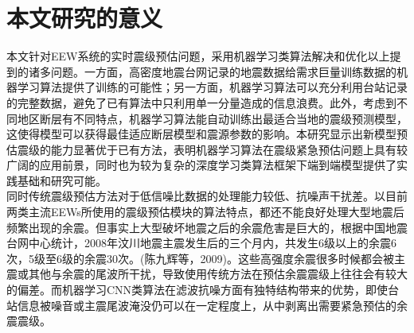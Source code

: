 \section{本文研究的意义}
\indent 本文针对EEW系统的实时震级预估问题，采用机器学习类算法解决和优化以上提到的诸多问题。一方面，高密度地震台网记录的地震数据给需求巨量训练数据的机器学习算法提供了训练的可能性；另一方面，机器学习算法可以充分利用台站记录的完整数据，避免了已有算法中只利用单一分量造成的信息浪费。此外，考虑到不同地区断层有不同特点，机器学习算法能自动训练出最适合当地的震级预测模型，这使得模型可以获得最佳适应断层模型和震源参数的影响。本研究显示出新模型预估震级的能力显著优于已有方法，表明机器学习算法在震级紧急预估问题上具有较广阔的应用前景，同时也为较为复杂的深度学习类算法框架下端到端模型提供了实践基础和研究可能。\\
\indent 同时传统震级预估方法对于低信噪比数据的处理能力较低、抗噪声干扰差。以目前两类主流EEWs所使用的震级预估模块的算法特点，都还不能良好处理大型地震后频繁出现的余震。但事实上大型破坏地震之后的余震危害是巨大的，根据中国地震台网中心统计，2008年汶川地震主震发生后的三个月内，共发生6级以上的余震6次，5级至6级的余震30次。(陈九辉等，2009)。这些高强度余震很多时候都会被主震或其他与余震的尾波所干扰，导致使用传统方法在预估余震震级上往往会有较大的偏差。而机器学习CNN类算法在滤波抗噪方面有独特结构带来的优势，即使台站信息被噪音或主震尾波淹没仍可以在一定程度上，从中剥离出需要紧急预估的余震震级。\\
